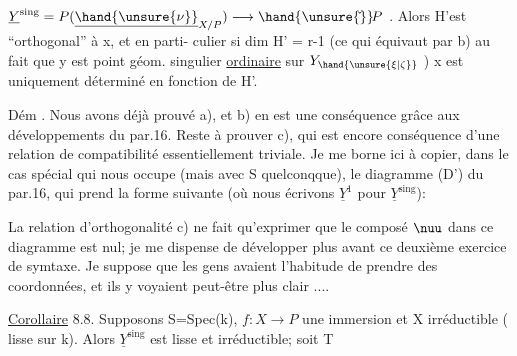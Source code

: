 
$\underline{Y}^{\mathrm{sing}} = P(\underline{\hand{\unsure{\nu}}}_{X/P}) \longrightarrow \hand{\unsure{\check{}}}\!P$ . Alors H'est ``orthogonal'' à x, et en parti-%
culier si dim H' = r-1 (ce qui équivaut par b) au fait que  
y est point géom. singulier \uline{ordinaire} sur $Y_{\hand{\unsure{\xi|\zeta}}}$ ) x est uniquement déterminé
en fonction de H'.

Dém . Nous avons déjà prouvé a), et b) en est une conséquence
grâce aux développements du par.16. Reste à prouver c), qui est
encore conséquence d'une relation de compatibilité essentiellement
triviale. Je me borne ici à copier, dans le cas spécial qui nous
occupe (mais avec S quelconqque), le diagramme (D') du par.16, qui
prend la forme suivante (où nous écrivons $\underline{Y}^1$ pour $\underline{Y}^{\mathrm{sing}}$):


La relation d'orthogonalité c) ne fait qu'exprimer que le composé
$\nuu$ dans ce diagramme est nul; je me dispense de développer plus
avant ce deuxième exercice de symtaxe. Je suppose que les gens avaient
l'habitude de prendre des coordonnées, et ils y voyaient peut-être plus
clair ....

\uline{Corollaire} 8.8. Supposons S=Spec(k),  $f : X \to P$ une immersion et X
irréductible ( lisse sur k).  Alors $\underline{Y}^{\mathrm{sing}}$ est lisse et irréductible; soit T

